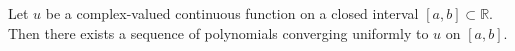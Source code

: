 Let $u$ be a complex-valued continuous function on a closed interval $[a, b] \subset \mathbb{R}$. Then there exists a sequence of polynomials converging uniformly to $u$ on $[a, b]$.
